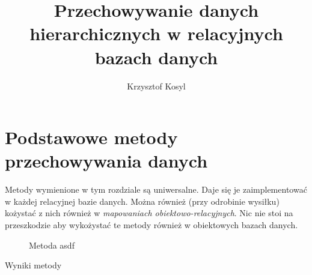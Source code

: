 \documentclass[12pt,a4paper,oneside]{report}
\author{Krzysztof Kosyl}
\title{Przechowywanie danych hierarchicznych w relacyjnych bazach danych}
\begin{document}



\tableofcontents{}






\chapter{Podstawowe metody przechowywania danych}

Metody wymienione w tym rozdziale są uniwersalne. Daje się je zaimplementować w każdej relacyjnej bazie danych. 
Można również (przy odrobinie wysiłku) kożystać z nich również w \emph{mapowaniach obiektowo-relacyjnych}.
Nic nie stoi na przeszkodzie aby wykożystać te metody również w obiektowych bazach danych.

	
	

\begin{figure}
\begin{center}
\end{center}
\caption{Metoda asdf}
\label{fig:img_chart_simple}
\end{figure}

\begin{table}[h]
  \caption{Wyniki metody }
\begin{center}
\end{center}
\end{table}
	
	
	
\end{document}
